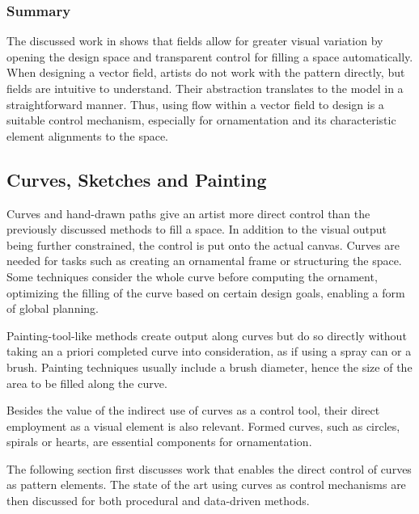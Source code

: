

\subsubsection{Summary}
\label{subsec:analysis_vectorfields_summary}

The discussed work in  shows that fields allow for greater visual variation by opening the design space and transparent control for filling a space automatically. When designing a vector field, artists do not work with the pattern directly, but fields are intuitive to understand. Their abstraction translates to the model in a straightforward manner. Thus, using flow within a vector field to design is a suitable control mechanism, especially for ornamentation and its characteristic element alignments to the space.




\subsection{Curves, Sketches and Painting}
\label{subsec:analysis_curves_sketches_painting}

Curves and hand-drawn paths give an artist more direct control than the previously discussed methods to fill a space. In addition to the visual output being further constrained, the control is put onto the actual canvas. Curves are needed for tasks such as creating an ornamental frame or structuring the space. Some techniques consider the whole curve before computing the ornament, optimizing the filling of the curve based on certain design goals, enabling a form of global planning.

Painting-tool-like methods create output along curves but do so directly without taking an a priori completed curve into consideration, as if using a spray can or a brush. Painting techniques usually include a brush diameter, hence the size of the area to be filled along the curve.

Besides the value of the indirect use of curves as a control tool, their direct employment as a visual element is also relevant. Formed curves, such as circles, spirals or hearts, are essential components for ornamentation.

The following section first discusses work that enables the direct control of curves as pattern elements. The state of the art using curves as control mechanisms are then discussed for both procedural and data-driven methods.



